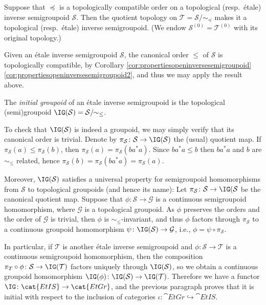 \begin{proposition}
Suppose that $\preceq$ is a topologically compatible order on a topological (resp.\ étale) inverse semigroupoid $\mathcal{S}$. Then the quotient topology on $\mathcal{T}=\mathcal{S}/\!\!\sim_{\preceq}$ makes it a topological (resp.\ étale) inverse semigroupoid. (We endow $\mathcal{S}^{(0)}=\mathcal{T}^{(0)}$ with its original topology.)
\end{proposition}

Given an étale inverse semigroupoid $\mathcal{S}$, the canonical order $\leq$ of $\mathcal{S}$ is topologically compatible, by Corollary \ref{cor:propertiesopeninversesemigroupoid}\ref{cor:propertiesopeninversesemigroupoid2}, and thus we may apply the result above.

\begin{definition}
    The \emph{initial groupoid} of an étale inverse semigroupoid is the topological (semi)groupoid $\IG(\mathcal{S})=\mathcal{S}/\!\!\sim_{\leq}$.
\end{definition}

To check that $\IG(\mathcal{S})$ is indeed a groupoid, we may simply verify that its canonical order is trivial. Denote by $\pi_{\mathcal{S}}\colon\mathcal{S}\to\IG(\mathcal{S})$ the (usual) quotient map. If $\pi_{\mathcal{S}}(a)\leq\pi_{\mathcal{S}}(b)$, then $\pi_{\mathcal{S}}(a)=\pi_{\mathcal{S}}(ba^*a)$. Since $ba^*a\leq b$ then $ba^*a$ and $b$ are $\sim_{\leq}$ related, hence $\pi_{\mathcal{S}}(b)=\pi_{\mathcal{S}}(ba^*a)=\pi_{\mathcal{S}}(a)$.

Moreover, $\IG(\mathcal{S})$ satisfies a universal property for semigroupoid homomorphisms from $\mathcal{S}$ to topological groupoids (and hence its name): Let $\pi_{\mathcal{S}}\colon\mathcal{S}\to\IG(\mathcal{S}$ be the canonical quotient map. Suppose that $\phi\colon\mathcal{S}\to\mathcal{G}$ is a continuous semigroupoid homomorphism, where $\mathcal{G}$ is a topological groupoid. As $\phi$ preserves the orders and the order of $\mathcal{G}$ is trivial, then $\phi$ is $\sim_{\leq}$-invariant, and thus $\phi$ factors through $\pi_\mathcal{S}$ to a continuous groupoid homomorphism $\psi\colon \IG(\mathcal{S})\to\mathcal{G}$, i.e., $\phi=\psi\circ\pi_{\mathcal{S}}$.

In particular, if $\mathcal{T}$ is another étale inverse semigroupoid and $\phi\colon\mathcal{S}\to\mathcal{T}$ is a continuous semigroupoid homomorphism, then the composition $\pi_T\circ\phi\colon\mathcal{S}\to\IG(\mathcal{T})$ factors uniquely through $\IG(\mathcal{S})$, so we obtain a continuous groupoid homomorphism $\IG(\phi)\colon\IG(\mathcal{S})\to\IG(\mathcal{T})$. Therefore we have a functor $\IG\colon\cat{EtIS}\to\cat{EtGr}$, and the previous paragraph proves that it is initial with respect to the inclusion of categories $\iota\colon\cat{EtGr}\hookrightarrow\cat{EtIS}$.


